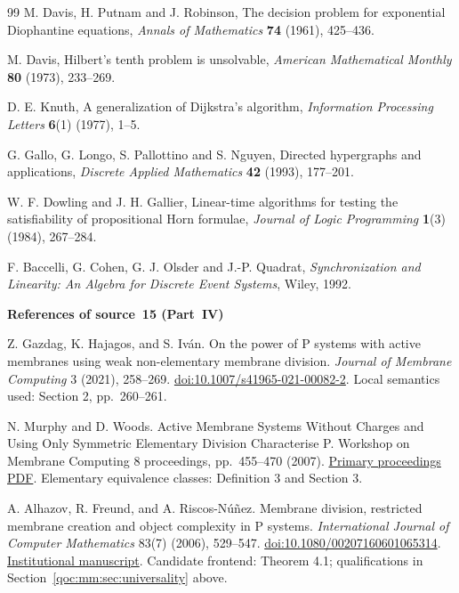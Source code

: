 \documentclass[11pt,letterpaper]{article}
\theoremstyle{definition}
\theoremstyle{remark}
\begin{document}
\begin{thebibliography}{99}
M. Davis, H. Putnam and J. Robinson, The decision problem for exponential Diophantine equations, \emph{Annals of Mathematics} \textbf{74} (1961), 425--436.

M. Davis, Hilbert's tenth problem is unsolvable, \emph{American Mathematical Monthly} \textbf{80} (1973), 233--269.

D. E. Knuth, A generalization of Dijkstra's algorithm, \emph{Information Processing Letters} \textbf{6}(1) (1977), 1--5.

G. Gallo, G. Longo, S. Pallottino and S. Nguyen, Directed hypergraphs and applications, \emph{Discrete Applied Mathematics} \textbf{42} (1993), 177--201.

W. F. Dowling and J. H. Gallier, Linear-time algorithms for testing the satisfiability of propositional Horn formulae, \emph{Journal of Logic Programming} \textbf{1}(3) (1984), 267--284.

F. Baccelli, G. Cohen, G. J. Olsder and J.-P. Quadrat, \emph{Synchronization and Linearity: An Algebra for Discrete Event Systems}, Wiley, 1992.

\item[]\textbf{References of source~15 (Part~IV)}

Z. Gazdag, K. Hajagos, and S. Iv\'an.
On the power of P systems with active membranes using weak non-elementary membrane division.
\emph{Journal of Membrane Computing} 3 (2021), 258--269.
\href{https://doi.org/10.1007/s41965-021-00082-2}{doi:10.1007/s41965-021-00082-2}.
Local semantics used: Section 2, pp.~260--261.

N. Murphy and D. Woods.
Active Membrane Systems Without Charges and Using Only Symmetric Elementary Division Characterise P.
Workshop on Membrane Computing 8 proceedings, pp.~455--470 (2007).
\href{https://www.seerc.org/wmc8/procedings_web/pages455-470.pdf}{Primary proceedings PDF}.
Elementary equivalence classes: Definition 3 and Section 3.

A. Alhazov, R. Freund, and A. Riscos-N\'u\~nez.
Membrane division, restricted membrane creation and object complexity in P systems.
\emph{International Journal of Computer Mathematics} 83(7) (2006), 529--547.
\href{https://doi.org/10.1080/00207160601065314}{doi:10.1080/00207160601065314}.
\href{https://idus.us.es/bitstreams/dcac15aa-404e-4102-88e2-08ec23b7df8a/download}{Institutional manuscript}.
Candidate frontend: Theorem 4.1; qualifications in Section~\ref{qoc:mm:sec:universality} above.


\end{thebibliography}
\end{document}
